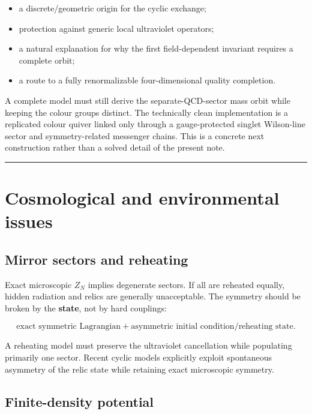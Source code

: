 \documentclass[11pt,a4paper]{article}
\providecommand{\tightlist}{\setlength{\itemsep}{0pt}\setlength{\parskip}{0pt}}
\begin{document}
\begin{itemize}
\tightlist
\item
  a discrete/geometric origin for the cyclic exchange;
\item
  protection against generic local ultraviolet operators;
\item
  a natural explanation for why the first field-dependent invariant
  requires a complete orbit;
\item
  a route to a fully renormalizable four-dimensional quality completion.
\end{itemize}

A complete model must still derive the separate-QCD-sector mass orbit
while keeping the colour groups distinct. The technically clean
implementation is a replicated colour quiver linked only through a
gauge-protected singlet Wilson-line sector and symmetry-related
messenger chains. This is a concrete next construction rather than a
solved detail of the present note.

\begin{center}\rule{0.5\linewidth}{0.5pt}\end{center}

\section{Cosmological and environmental
issues}\label{cosmological-and-environmental-issues}

\subsection{Mirror sectors and
reheating}\label{mirror-sectors-and-reheating}

Exact microscopic \(Z_N\) implies degenerate sectors. If all are
reheated equally, hidden radiation and relics are generally
unacceptable. The symmetry should be broken by the \textbf{state}, not
by hard couplings:

\[
\text{exact symmetric Lagrangian}
+\text{asymmetric initial condition/reheating state}.
\]

A reheating model must preserve the ultraviolet cancellation while
populating primarily one sector. Recent cyclic models explicitly exploit
spontaneous asymmetry of the relic state while retaining exact
microscopic symmetry.

\subsection{Finite-density potential}\label{finite-density-potential}
\end{document}
